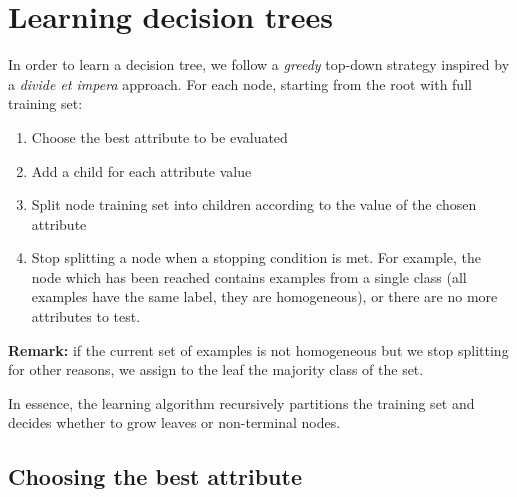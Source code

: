 \section{Learning decision trees}
In order to learn a decision tree, we follow a \textit{greedy} top-down strategy
inspired by a \textit{divide et impera} approach. For each node, starting from the
root with full training set:
\begin{enumerate}
	\item Choose the best attribute to be evaluated

	\item Add a child for each attribute value

	\item Split node training set into children according to the value of the chosen
		attribute

	\item Stop splitting a node when a stopping condition is met. For example, the
		node which has been reached contains examples from a single class (all
		examples have the same label, they are homogeneous), or there are no more attributes
		to test.
\end{enumerate}

\textbf{Remark:} if the current set of examples is not homogeneous but we stop
splitting for other reasons, we assign to the leaf the majority class of the set.
\newline

In essence, the learning algorithm recursively partitions the training set and
decides whether to grow leaves or non-terminal nodes.

\subsection{Choosing the best attribute}


